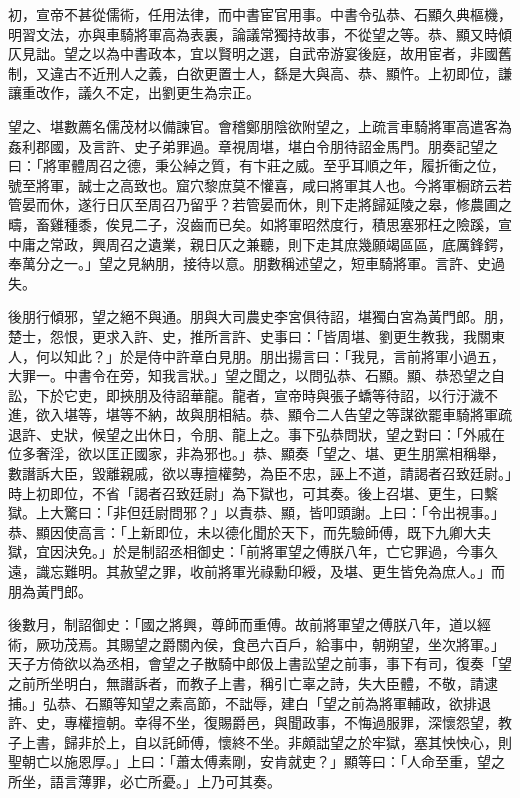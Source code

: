 \begin{pinyinscope}
初，宣帝不甚從儒術，任用法律，而中書宦官用事。中書令弘恭、石顯久典樞機，明習文法，亦與車騎將軍高為表裏，論議常獨持故事，不從望之等。恭、顯又時傾仄見詘。望之以為中書政本，宜以賢明之選，自武帝游宴後庭，故用宦者，非國舊制，又違古不近刑人之義，白欲更置士人，繇是大與高、恭、顯忤。上初即位，謙讓重改作，議久不定，出劉更生為宗正。

望之、堪數薦名儒茂材以備諫官。會稽鄭朋陰欲附望之，上疏言車騎將軍高遣客為姦利郡國，及言許、史子弟罪過。章視周堪，堪白令朋待詔金馬門。朋奏記望之曰：「將軍體周召之德，秉公綽之質，有卞莊之威。至乎耳順之年，履折衝之位，號至將軍，誠士之高致也。窟穴黎庶莫不懽喜，咸曰將軍其人也。今將軍橱跻云若管晏而休，遂行日仄至周召乃留乎？若管晏而休，則下走將歸延陵之皋，修農圃之疇，畜雞種黍，俟見二子，沒齒而已矣。如將軍昭然度行，積思塞邪枉之險蹊，宣中庸之常政，興周召之遺業，親日仄之兼聽，則下走其庶幾願竭區區，底厲鋒鍔，奉萬分之一。」望之見納朋，接待以意。朋數稱述望之，短車騎將軍。言許、史過失。

後朋行傾邪，望之絕不與通。朋與大司農史李宮俱待詔，堪獨白宮為黃門郎。朋，楚士，怨恨，更求入許、史，推所言許、史事曰：「皆周堪、劉更生教我，我關東人，何以知此？」於是侍中許章白見朋。朋出揚言曰：「我見，言前將軍小過五，大罪一。中書令在旁，知我言狀。」望之聞之，以問弘恭、石顯。顯、恭恐望之自訟，下於它吏，即挾朋及待詔華龍。龍者，宣帝時與張子蟜等待詔，以行汙濊不進，欲入堪等，堪等不納，故與朋相結。恭、顯令二人告望之等謀欲罷車騎將軍疏退許、史狀，候望之出休日，令朋、龍上之。事下弘恭問狀，望之對曰：「外戚在位多奢淫，欲以匡正國家，非為邪也。」恭、顯奏「望之、堪、更生朋黨相稱舉，數譖訴大臣，毀離親戚，欲以專擅權勢，為臣不忠，誣上不道，請謁者召致廷尉。」時上初即位，不省「謁者召致廷尉」為下獄也，可其奏。後上召堪、更生，曰繫獄。上大驚曰：「非但廷尉問邪？」以責恭、顯，皆叩頭謝。上曰：「令出視事。」恭、顯因使高言：「上新即位，未以德化聞於天下，而先驗師傅，既下九卿大夫獄，宜因決免。」於是制詔丞相御史：「前將軍望之傅朕八年，亡它罪過，今事久遠，識忘難明。其赦望之罪，收前將軍光祿勳印綬，及堪、更生皆免為庶人。」而朋為黃門郎。

後數月，制詔御史：「國之將興，尊師而重傅。故前將軍望之傅朕八年，道以經術，厥功茂焉。其賜望之爵關內侯，食邑六百戶，給事中，朝朔望，坐次將軍。」天子方倚欲以為丞相，會望之子散騎中郎伋上書訟望之前事，事下有司，復奏「望之前所坐明白，無譖訴者，而教子上書，稱引亡辜之詩，失大臣體，不敬，請逮捕。」弘恭、石顯等知望之素高節，不詘辱，建白「望之前為將軍輔政，欲排退許、史，專權擅朝。幸得不坐，復賜爵邑，與聞政事，不悔過服罪，深懷怨望，教子上書，歸非於上，自以託師傅，懷終不坐。非頗詘望之於牢獄，塞其怏怏心，則聖朝亡以施恩厚。」上曰：「蕭太傅素剛，安肯就吏？」顯等曰：「人命至重，望之所坐，語言薄罪，必亡所憂。」上乃可其奏。


\end{pinyinscope}
